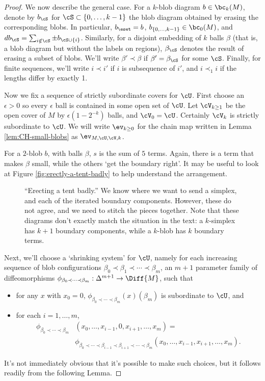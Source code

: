 \begin{proof}
We now describe the general case. For a $k$-blob diagram $b \in \bc_k(M)$, denote by $b_\cS$ for $\cS \subset \{0, \ldots, k-1\}$ the blob diagram obtained by erasing the corresponding blobs. In particular, $b_\eset = b$, $b_{\{0,\ldots,k-1\}} \in \bc_0(M)$, and $d b_\cS = \sum_{i \notin \cS} \pm  b_{\cS \cup \{i\}}$.
Similarly, for a disjoint embedding of $k$ balls $\beta$ (that is, a blob diagram but without the labels on regions), $\beta_\cS$ denotes the result of erasing a subset of blobs. We'll write $\beta' \prec \beta$ if $\beta' = \beta_\cS$ for some $\cS$. Finally, for finite sequences, we'll write $i \prec i'$ if $i$ is subsequence of $i'$, and $i \prec_1 i$ if the lengths differ by exactly 1.

Now we fix a sequence of strictly subordinate covers for $\cU$. First choose an $\epsilon > 0$ so every $\epsilon$ ball is contained in some open set of $\cU$. Let $\cV_{k \geq 1}$ be the open cover of $M$ by $\epsilon (1-2^{-k})$ balls, and $\cV_0 = \cU$. Certainly $\cV_k$ is strictly subordinate to $\cU$. We will write $\ev_{k \geq 0}$ for the chain map written in Lemma \ref{lem:CH-small-blobs} as $\ev_{M,\cU,\cV,k}$.

For a $2$-blob $b$, with balls $\beta$, $s$ is the sum of $5$ terms. Again, there is a term that makes $\beta$ small, while the others `get the boundary right'. It may be useful to look at Figure \ref{fig:erectly-a-tent-badly} to help understand the arrangement.
\begin{figure}[!ht]
\todo{}
\caption{``Erecting a tent badly.'' We know where we want to send a simplex, and each of the iterated boundary components. However, these do not agree, and we need to stitch the pieces together. Note that these diagrams don't exactly match the situation in the text: a $k$-simplex has $k+1$ boundary components, while a $k$-blob has $k$ boundary terms.}
\end{figure}

Next, we'll choose a `shrinking system' for $\cU$, namely for each increasing sequence of blob configurations
$\beta_0 \prec \beta_1 \prec \cdots \prec \beta_m$, an $m+1$ parameter family of diffeomorphisms
$\phi_{\beta_0 \prec \cdots \prec \beta_m} : \Delta^{m+1} \to \Diff{M}$, such that
\begin{itemize}
\item for any $x$ with $x_0 = 0$, $\phi_{\beta_0 \prec \cdots \prec \beta_m}(x)(\beta_m)$ is subordinate to $\cU$, and
\item for each $i = 1, \ldots, m$,
\begin{align*}
\phi_{\beta_0 \prec \cdots \prec \beta_m}&(x_0, \ldots, x_{i-1},0,x_{i+1},\ldots,x_m) = \\ &\phi_{\beta_0 \prec \cdots \prec \beta_{i-1} \prec \beta_{i+1} \prec \cdots \prec \beta_m}(x_0,\ldots, x_{i-1},x_{i+1},\ldots,x_m).
\end{align*}
\end{itemize}
It's not immediately obvious that it's possible to make such choices, but it follows readily from the following Lemma.



\end{proof}

